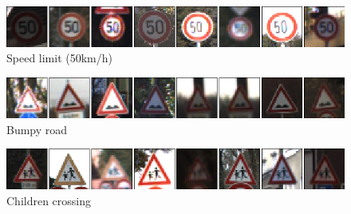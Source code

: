 			\begin{figure}[H]
				\begin{center}
				\includegraphics[width=1\textwidth]{images/desarrollo/imagenes/alemania/1__(3).png}
				\end{center}
				\begin{center}
				\caption{\small{Speed limit (50km/h)}}
				\end{center}
				\vspace{-1.5em}
			\end{figure}

			
			\begin{figure}[H]
				\begin{center}
				\includegraphics[width=1\textwidth]{images/desarrollo/imagenes/alemania/1__(23).png}
				\end{center}
				\begin{center}
				\caption{\small{Bumpy road}}
				\end{center}
				\vspace{-1.5em}
			\end{figure}

			\begin{figure}[H]
				\begin{center}
				\includegraphics[width=1\textwidth]{images/desarrollo/imagenes/alemania/1__(29).png}
				\end{center}
				\begin{center}
				\caption{\small{Children crossing}}
				\end{center}
				\vspace{-1.5em}
			\end{figure}
			
